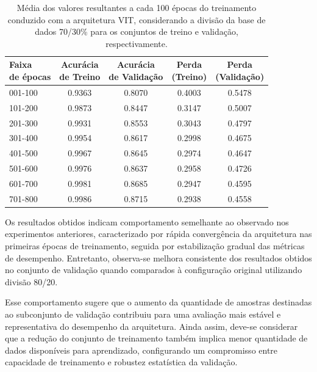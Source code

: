 \begin{table}[h]
	\centering
	\caption{Média dos valores resultantes a cada 100 épocas do treinamento conduzido com a arquitetura \acs{VIT}, considerando a divisão da base de dados 70/30\% para os conjuntos de treino e validação, respectivamente.}
	\label{tab:vit_7030_results}
	\begin{tabular}{l|c|c|c|c}
		
		\toprule
		\makecell{\textbf{Faixa} \\ \textbf{de épocas}}&
		\makecell{\textbf{Acurácia}\\ \textbf{de Treino}} &
		\makecell{\textbf{Acurácia}\\ \textbf{de Validação}} &
		\makecell{\textbf{Perda}\\ \textbf{(Treino)}} &
		\makecell{\textbf{Perda}\\ \textbf{(Validação)}} \\
		\midrule
		
		001-100 & 0.9363 & 0.8070 & 0.4003 & 0.5478 \\
		101-200 & 0.9873 & 0.8447 & 0.3147 & 0.5007 \\
		201-300 & 0.9931 & 0.8553 & 0.3043 & 0.4797 \\
		301-400 & 0.9954 & 0.8617 & 0.2998 & 0.4675 \\
		401-500 & 0.9967 & 0.8645 & 0.2974 & 0.4647 \\
		501-600 & 0.9976 & 0.8637 & 0.2958 & 0.4726 \\
		601-700 & 0.9981 & 0.8685 & 0.2947 & 0.4595 \\
		701-800 & 0.9986 & 0.8715 & 0.2938 & 0.4558 \\
		
		\bottomrule
	\end{tabular}
\end{table}

Os resultados obtidos indicam comportamento semelhante ao observado nos experimentos anteriores, caracterizado por rápida convergência da arquitetura nas primeiras épocas de treinamento, seguida por estabilização gradual das métricas de desempenho. Entretanto, observa-se melhora consistente dos resultados obtidos no conjunto de validação quando comparados à configuração original utilizando divisão 80/20. 

Esse comportamento sugere que o aumento da quantidade de amostras destinadas ao subconjunto de validação contribuiu para uma avaliação mais estável e representativa do desempenho da arquitetura. Ainda assim, deve-se considerar que a redução do conjunto de treinamento também implica menor quantidade de dados disponíveis para aprendizado, configurando um compromisso entre capacidade de treinamento e robustez estatística da validação.

